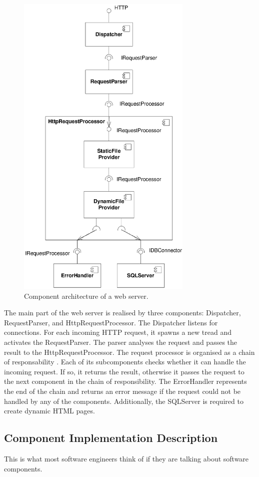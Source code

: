 \begin{figure}[htbp]
\centering
\includegraphics[width=3.3in]{example/WebserverComponents}
\caption{Component architecture of a web server.}
\label{fig:WebserverComponents}
\end{figure}

The main part of the web server is realised by three components: Dispatcher,
RequestParser, and HttpRequestProcessor. The Dispatcher listens for connections.
For each incoming HTTP request, it spawns a new tread and
activates the RequestParser. The parser analyses the request and passes the
result to the HttpRequestProcessor. The request processor is organised as a
chain of responsability \cite{gamma1995a}. Each of its subcomponents checks
whether it can handle the incoming request. If so, it returns the result,
otherwise it passes the request to the next component in the chain of
responsibility. The ErrorHandler represents the end of the chain and returns an
error message if the request could not be handled by any of the components.
Additionally, the SQLServer is required to create dynamic HTML pages.

\subsection{Component Implementation Description}
This is what most software engineers think of if they are talking about
software components.

